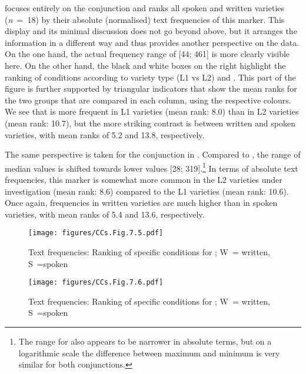  focuses entirely on the conjunction  and ranks all spoken and written varieties (\textit{n~}=~18) by their absolute (normalised) text frequencies of this marker. This display and its minimal discussion does not go beyond  above, but it arranges the information in a different way and thus provides another perspective on the data. On the one hand, the actual frequency range of  [44; 461] is more clearly visible here. On the other hand, the black and white boxes on the right highlight the ranking of conditions according to variety type (L1 vs L2) and . This part of the figure is further supported by triangular indicators that show the mean ranks for the two groups that are compared in each column, using the respective colours. We see that  is more frequent in L1 varieties (mean rank: 8.0) than in L2 varieties (mean rank: 10.7), but the more striking contrast is between written and spoken varieties, with mean ranks of 5.2 and 13.8, respectively.

The same perspective is taken for the conjunction  in . Compared to , the range of median values is shifted towards lower values [28; 319].{\footnote{The range for  also appears to be narrower in absolute terms, but on a logarithmic scale the difference between maximum and minimum is very similar for both conjunctions.}} In terms of absolute text frequencies, this marker is somewhat more common in the L2 varieties under investigation (mean rank: 8.6) compared to the L1 varieties (mean rank: 10.6). Once again, frequencies in written varieties are much higher than in spoken varieties, with mean ranks of 5.4 and 13.6, respectively.

\begin{figure}
\texttt{[image: figures/CCs.Fig.7.5.pdf]}
\caption{\label{bkm:Ref52266654}\label{fig:7.5}Text frequencies: Ranking of specific conditions for ; W~= written, S~=spoken}
\end{figure}

\begin{figure}
\texttt{[image: figures/CCs.Fig.7.6.pdf]}
\caption{\label{bkm:Ref52266684}\label{fig:7.6}Text frequencies: Ranking of specific conditions for ; W~= written, S~=spoken}
\end{figure}

